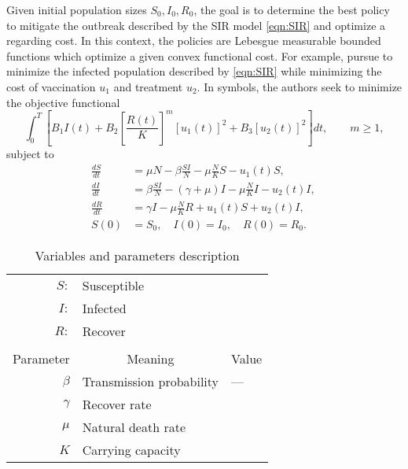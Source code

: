 Given initial population sizes $S_0, I_0, R_0$, the goal is to determine the best policy to
mitigate the outbreak described by the SIR model \eqref{eqn:SIR} and optimize a regarding  cost. In this context, the policies are Lebesgue measurable bounded functions
which optimize a given convex functional cost. For example, \citeauthor{Schaefer2009} pursue to minimize the infected population described by \eqref{eqn:SIR} while minimizing the cost of vaccination $u_1$ and treatment $u_2$. In symbols, the authors seek to minimize the objective functional
\begin{equation}
	\int_{0}^T	
		\left[
			B_1 I(t) 
			+ B_2 \left[\frac{R(t)}{K}\right]^m [u_1(t)]^2 + B_3 [u_2(t)]^2
		\right] dt,
		\qquad  m\geq 1,
\end{equation}
subject to
\begin{equation}
	\begin{aligned}
		\frac{dS}{dt} &=
			\mu N  
			- \beta \frac{S I}{N} 
			- \mu \frac{N}{K} S - u_1(t) S,
		\\
		\frac{dI}{dt} &=
			\beta \frac{S I}{N}
			- (\gamma  + \mu) I 
			- \mu \frac{N}{K} I
			- u_2(t) I,
		\\
		\frac{dR}{dt} &= 
			\gamma I 
			- \mu \frac{N}{K} R 
			+ u_1(t) S 
			+ u_2(t) I,
		\\
		S(0) &= S_0, \quad
		I(0) = I_0, \quad
		R(0) = R_0. \quad
	\end{aligned}
\end{equation}
\begin{table}
	\begin{center}
		\begin{tabular}{@{}rll@{}} 
			$S:$
			&
				Susceptible
			\\
			$I:$ 
			&	Infected
			\\
			$R:$ 
			&	Recover
			\\
			\\
			\multicolumn{1}{c}{Parameter}
			&
			\multicolumn{1}{c}{Meaning}
			& 
			\multicolumn{1}{c}{Value}
			\\
				\midrule
				$\beta$
				& 
					Transmission probability
				&
					---
			\\
				$\gamma$
				&
					Recover rate
			\\
				$\mu$
				&
					Natural death rate
			\\
				$K$
				&
					Carrying capacity
			\\
			\bottomrule
		\end{tabular}
		\caption{Variables and parameters description}
	\end{center}
\end{table}
